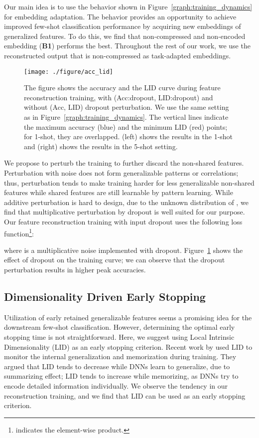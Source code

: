 \documentclass{article}
\begin{document}
Our main idea is to use the behavior shown in Figure~\ref{graph:training_dynamics} for embedding adaptation.
The behavior provides an opportunity to achieve improved few-shot classification performance by acquiring new embeddings of generalized features.
To do this, we find that non-compressed and non-encoded embedding (\textbf{B1}) performs the best. Throughout the rest of our work, we use the reconstructed output  that is non-compressed as task-adapted embeddings.

\begin{figure}[ht]
	\vskip -0.1in
	\begin{center}
		\centerline{\texttt{[image: ./figure/acc\_lid]}}
		\vskip -0.15in
		\caption{
			The figure shows the accuracy and the LID curve during feature reconstruction training, with (Acc:dropout, LID:dropout) and without (Acc, LID) dropout perturbation.
			We use the same setting as in Figure~\ref{graph:training_dynamics}.
			The vertical lines indicate the maximum accuracy (blue) and the minimum LID (red) points; for 1-shot, they are overlapped.
			(left) shows the results in the 1-shot and (right) shows the results in the 5-shot setting.
		}
		\label{graph:lids}
	\end{center}
	\vskip -0.25in
\end{figure}
We propose to perturb the training to further discard the non-shared features.  Perturbation with noise does not form generalizable patterns or correlations; thus, perturbation tends to make training harder for less generalizable non-shared features while shared features are still learnable by pattern learning. While additive perturbation is hard to design, due to the unknown distribution of , we find that multiplicative perturbation by dropout \cite{dropout} is well suited for our purpose. Our feature reconstruction training with input dropout uses the following loss function\footnote{ indicates the element-wise product.}:

where  is a multiplicative noise implemented with dropout.
Figure~\ref{graph:lids} shows the effect of dropout on the training curve; we can observe that the dropout perturbation results in higher peak accuracies. \subsection{Dimensionality Driven Early Stopping}
\label{subsection:early_stopping}
Utilization of early retained generalizable features seems a promising idea for the downstream few-shot classification. However, determining the optimal early stopping time is not straightforward. Here, we suggest using Local Intrinsic Dimensionality (LID) as an early stopping criterion. Recent work by \citet{Ma18b} used LID to monitor the internal generalization and memorization during training.
They argued that LID tends to decrease while DNNs learn to generalize, due to summarizing effect; LID tends to increase while memorizing, as DNNs try to encode detailed information individually.
We observe the tendency in our reconstruction training, and we find that LID can be used as an early stopping criterion.
\end{document}
